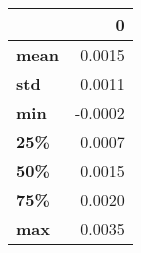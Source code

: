 \begin{tabular}{lr}
\toprule
{} &       0 \\
\midrule
\textbf{mean} &  0.0015 \\
\textbf{std } &  0.0011 \\
\textbf{min } & -0.0002 \\
\textbf{25\% } &  0.0007 \\
\textbf{50\% } &  0.0015 \\
\textbf{75\% } &  0.0020 \\
\textbf{max } &  0.0035 \\
\bottomrule
\end{tabular}
